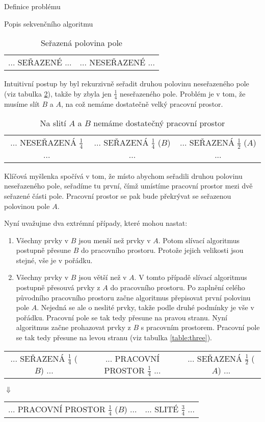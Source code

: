 \documentclass[a4paper,11pt]{article}
\begin{document}
\begin{section}{Definice problému}
\begin{subsection}{Popis sekvenčního algoritmu}
\begin{table}[ht]
\centering
\begin{tabular}{|c|c|}
... SEŘAZENÉ ... & ... NESEŘAZENÉ ...
\end{tabular}
\caption{Seřazená polovina pole}
\label{table:one}
\end{table}

Intuitivní postup by byl rekurzivně seřadit druhou polovinu neseřazeného pole (viz tabulka \ref{table:two}), takže by zbyla jen $\frac{1}{4}$
neseřazeného pole. Problém je v tom, že musíme slít $B$ a $A$, na což nemáme dostatečně velký pracovní prostor.


\begin{table}[ht]
\centering
\begin{tabular}{|c|c|c|}
... NESEŘAZENÁ $\frac{1}{4}$ ... & ... SEŘAZENÁ $\frac{1}{4}$ ($B$) ... & ... SEŘAZENÁ $\frac{1}{2}$ ($A$) ...
\end{tabular}
\caption{Na slití $A$ a $B$ nemáme dostatečný pracovní prostor}
\label{table:two}
\end{table}

Klíčová myšlenka spočívá v tom, že místo abychom seřadili druhou polovinu neseřazeného pole, seřadíme tu první,
čímž umístíme pracovní prostor mezi dvě seřazené části pole. Pracovní prostor se pak bude překrývat se seřazenou 
polovinou pole $A$.

Nyní uvažujme dva extrémní případy, které mohou nastat:
\begin{enumerate}
	\item Všechny prvky v $B$ jsou menší než prvky v $A$. Potom slívací algoritmus postupně přesune $B$ do pracovního
prostoru. Protože jejich velikosti jsou stejné, vše je v pořádku.

	\item Všechny prvky v $B$ jsou větší než v $A$. V tomto případě slívací algoritmus postupně přesouvá prvky z $A$
do pracovního prostoru. Po zaplnění celého původního pracovního prostoru začne algoritmus přepisovat první polovinu
pole $A$. Nejedná se ale o neslité prvky, takže podle druhé podmínky je vše v pořádku. Pracovní pole se tak tedy 
přesune na pravou stranu. Nyní algoritmus začne prohazovat prvky z $B$ s pracovním prostorem. Pracovní pole se tak 
tedy přesune na levou stranu (viz tabulka \ref{table:three}).
\end{enumerate}

\begin{table}[ht]
\centering
\begin{tabular}{|c|c|c|}
... SEŘAZENÁ $\frac{1}{4}$ ($B$) ... & ... PRACOVNÍ PROSTOR $\frac{1}{4}$ ... & ... SEŘAZENÁ $\frac{1}{2}$ ($A$) ...
\end{tabular}
\begin{center}
$\Downarrow$
\end{center}
\begin{tabular}{|c|c|}
... PRACOVNÍ PROSTOR $\frac{1}{4}$ ($B$) ... & ... SLITÉ $\frac{3}{4}$ ...
\end{tabular}


\end{table}
\end{subsection}
\end{section}
\end{document}
